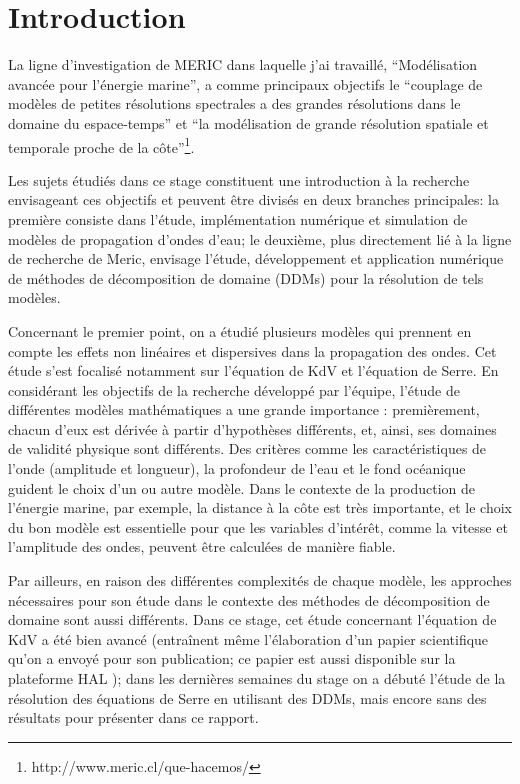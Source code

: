 \section{Introduction}

\indent La ligne d'investigation de MERIC dans laquelle j'ai travaillé, ``Modélisation avancée pour l'énergie marine'', a comme principaux objectifs le ``couplage de modèles de petites résolutions spectrales a des grandes résolutions dans le domaine du espace-temps'' et ``la modélisation de grande résolution spatiale et temporale proche de la côte''\footnote{http://www.meric.cl/que-hacemos/}.

\indent Les sujets étudiés dans ce stage constituent une introduction à la recherche envisageant ces objectifs et peuvent être divisés en deux branches principales: la première consiste dans l'étude, implémentation numérique et simulation de modèles de propagation d'ondes d'eau; le deuxième, plus directement lié à la ligne de recherche de Meric, envisage l'étude, développement et application numérique de méthodes de décomposition de domaine (DDMs) pour la résolution de tels modèles.

\indent Concernant le premier point, on a étudié plusieurs modèles qui prennent en compte les effets non linéaires et dispersives dans la propagation des ondes. Cet étude s'est focalisé notamment sur l'équation de KdV et l'équation de Serre. En considérant les objectifs de la recherche développé par l'équipe, l'étude de différentes modèles mathématiques a une grande importance : premièrement, chacun d'eux est dérivée à partir d'hypothèses différents, et, ainsi, ses domaines de validité physique sont différents. Des critères comme les caractéristiques de l'onde (amplitude et longueur), la profondeur de l'eau et le fond océanique guident le choix d'un ou autre modèle. Dans le contexte de la production de l'énergie marine, par exemple, la distance à la côte est très importante, et le choix du bon modèle est essentielle pour que les variables d'intérêt, comme la vitesse et l'amplitude des ondes, peuvent être calculées de manière fiable.

\indent Par ailleurs, en raison des différentes complexités de chaque modèle, les approches nécessaires pour son étude dans le contexte des méthodes de décomposition de domaine sont aussi différents. Dans ce stage, cet étude concernant l'équation de KdV a été bien avancé (entraînent même l'élaboration d'un papier scientifique qu'on a envoyé pour son publication; ce papier est aussi disponible sur la plateforme HAL \cite{joao2016}); dans les dernières semaines du stage on a débuté l'étude de la résolution des équations de Serre en utilisant des DDMs, mais encore sans des résultats pour présenter dans ce rapport.

